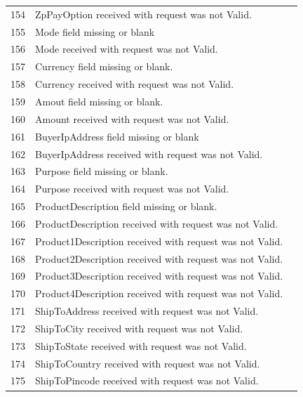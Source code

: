 \documentclass{article}
\newcommand{\xmark}{\ding{55}}
\begin{document}
\begin{longtable}{||c|p{12.5cm}||c|}
154 &ZpPayOption received with request was not Valid.& \textcolor{red} {\xmark} \\
155 &Mode field missing or blank& \textcolor{red} {\xmark} \\
156 &Mode received with request was not Valid.& \textcolor{red} {\xmark} \\
157 &Currency field missing or blank.& \textcolor{red} {\xmark} \\
158 &Currency received with request was not Valid.& \textcolor{red} {\xmark} \\
159 &Amout field missing or blank.& \textcolor{red} {\xmark} \\
160 &Amount received with request was not Valid.& \textcolor{red} {\xmark} \\
161 &BuyerIpAddress field missing or blank& \textcolor{red} {\xmark} \\
162 &BuyerIpAddress received with request was not Valid.& \textcolor{red} {\xmark} \\
163 &Purpose field missing or blank.& \textcolor{red} {\xmark} \\
164 &Purpose received with request was not Valid.& \textcolor{red} {\xmark} \\
165 &ProductDescription field missing or blank.& \textcolor{red} {\xmark} \\
166 &ProductDescription received with request was not Valid.& \textcolor{red} {\xmark} \\
167 &Product1Description received with request was not Valid.& \textcolor{red} {\xmark} \\
168 &Product2Description received with request was not Valid.& \textcolor{red} {\xmark} \\
169 &Product3Description received with request was not Valid.& \textcolor{red} {\xmark} \\
170 &Product4Description received with request was not Valid.& \textcolor{red} {\xmark} \\
171 &ShipToAddress received with request was not Valid.& \textcolor{red} {\xmark} \\
172 &ShipToCity received with request was not Valid.& \textcolor{red} {\xmark} \\
173 &ShipToState received with request was not Valid.& \textcolor{red} {\xmark} \\
174 &ShipToCountry received with request was not Valid.& \textcolor{red} {\xmark} \\
175 &ShipToPincode received with request was not Valid.& \textcolor{red} {\xmark} \\

\end{longtable}
\end{document}

